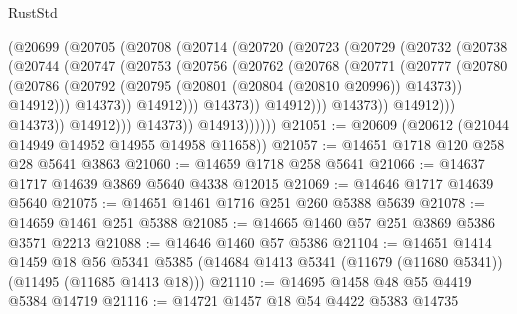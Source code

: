 \begin{lexlean}{RustStd}
\begin{coremodule}
                          (@20699
                            (@20705
                              (@20708
                                (@20714
                                  (@20720
                                    (@20723
                                      (@20729
                                        (@20732
                                          (@20738
                                            (@20744
                                              (@20747
                                                (@20753
                                                  (@20756
                                                    (@20762
                                                      (@20768
                                                        (@20771
                                                          (@20777
                                                            (@20780
                                                              (@20786
                                                                (@20792
                                                                  (@20795
                                                                    (@20801
                                                                      (@20804 (@20810 @20996))
                                                                      @14373))
                                                                  @14912)))
                                                            @14373))
                                                        @14912)))
                                                  @14373))
                                              @14912)))
                                        @14373))
                                    @14912)))
                              @14373))
                          @14912)))
                    @14373))
                @14913))))))
@21051 := @20609 (@20612 (@21044 @14949 @14952 @14955 @14958 @11658))
@21057 := @14651 @1718 @120 @258 @28 @5641 @3863
@21060 := @14659 @1718 @258 @5641
@21066 := @14637 @1717 @14639 @3869 @5640 @4338 @12015
@21069 := @14646 @1717 @14639 @5640
@21075 := @14651 @1461 @1716 @251 @260 @5388 @5639
@21078 := @14659 @1461 @251 @5388
@21085 := @14665 @1460 @57 @251 @3869 @5386 @3571 @2213
@21088 := @14646 @1460 @57 @5386
@21104 := @14651
    @1414
    @1459
    @18
    @56
    @5341
    @5385
    (@14684 @1413 @5341 (@11679 (@11680 @5341)) (@11495 (@11685 @1413 @18)))
@21110 := @14695 @1458 @48 @55 @4419 @5384 @14719
@21116 := @14721 @1457 @18 @54 @4422 @5383 @14735

\end{coremodule}
\end{lexlean}
